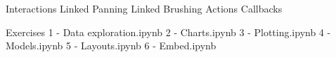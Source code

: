 

Interactions
  Linked Panning
  Linked Brushing
  Actions
  Callbacks


Exercises
1 - Data exploration.ipynb
2 - Charts.ipynb
3 - Plotting.ipynb
4 - Models.ipynb
5 - Layouts.ipynb
6 - Embed.ipynb
